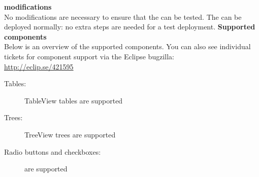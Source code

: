 \textbf{\gdaut{} modifications}\\
No modifications are necessary to ensure that the \gdaut{} can be tested. The \gdaut{} can be deployed normally: no extra steps are needed for a test deployment.
\textbf{Supported components}\\
Below is an overview of the supported components. You can also see individual tickets for component support via the Eclipse bugzilla:\\
\url{http://eclip.se/421595}
\begin{description}
\item [Tables:]{TableView tables are supported}
\item [Trees:]{TreeView trees are supported}
\item [Radio buttons and checkboxes:]{are supported}
\end{description}
